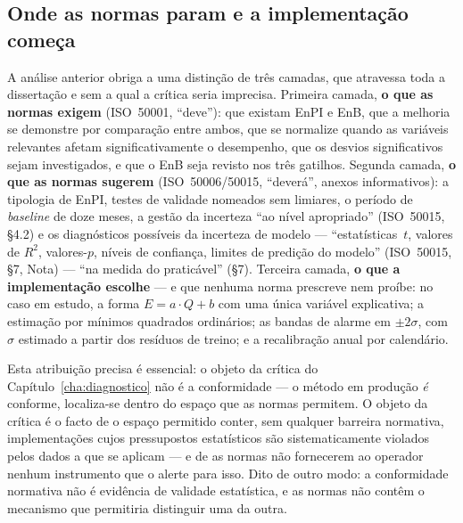 \subsection{Onde as normas param e a implementação começa}
\label{sec:enb-camadas}

A análise anterior obriga a uma distinção de três camadas, que atravessa toda a dissertação e sem a qual a crítica seria imprecisa. Primeira camada, \textbf{o que as normas exigem} (ISO~50001, \enquote{deve}): que existam EnPI e EnB, que a melhoria se demonstre por comparação entre ambos, que se normalize quando as variáveis relevantes afetam significativamente o desempenho, que os desvios significativos sejam investigados, e que o EnB seja revisto nos três gatilhos. Segunda camada, \textbf{o que as normas sugerem} (ISO~50006/50015, \enquote{deverá}, anexos informativos): a tipologia de EnPI, testes de validade nomeados sem limiares, o período de \emph{baseline} de doze meses, a gestão da incerteza \enquote{ao nível apropriado} (ISO~50015, \S4.2) e os diagnósticos possíveis da incerteza de modelo --- \enquote{estatísticas~$t$, valores de $R^2$, valores-$p$, níveis de confiança, limites de predição do modelo} (ISO~50015, \S7, Nota) --- \enquote{na medida do praticável} (\S7). Terceira camada, \textbf{o que a implementação escolhe} --- e que nenhuma norma prescreve nem proíbe: no caso em estudo, a forma $E = a \cdot Q + b$ com uma única variável explicativa; a estimação por mínimos quadrados ordinários; as bandas de alarme em $\pm 2\sigma$, com $\sigma$ estimado a partir dos resíduos de treino; e a recalibração anual por calendário.

Esta atribuição precisa é essencial: o objeto da crítica do Capítulo~\ref{cha:diagnostico} não é a conformidade --- o método em produção \emph{é} conforme, localiza-se dentro do espaço que as normas permitem. O objeto da crítica é o facto de o espaço permitido conter, sem qualquer barreira normativa, implementações cujos pressupostos estatísticos são sistematicamente violados pelos dados a que se aplicam --- e de as normas não fornecerem ao operador nenhum instrumento que o alerte para isso. Dito de outro modo: a conformidade normativa não é evidência de validade estatística, e as normas não contêm o mecanismo que permitiria distinguir uma da outra.

